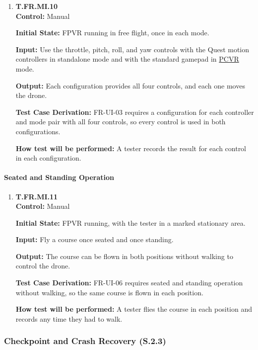 \documentclass[12pt, titlepage]{article}
\begin{document}
{\begin{enumerate}
\item{\hypertarget{test-fr-mi-10}{}\textbf{T.FR.MI.10}\\}
\textbf{Control:} Manual

\textbf{Initial State:} FPVR running in free flight, once in each mode.

\textbf{Input:} Use the throttle, pitch, roll, and yaw controls with the Quest motion
controllers in standalone mode and with the standard gamepad in \hyperlink{abbr:PCVR}{PCVR} mode.

\textbf{Output:} Each configuration provides all four controls, and each one moves the
drone.

\textbf{Test Case Derivation:} \mbox{FR-UI-03} requires a configuration for each
controller and mode pair with all four controls, so every control is used in both
configurations.

\textbf{How test will be performed:} A tester records the result for each control in
each configuration.

\end{enumerate}

\paragraph{Seated and Standing Operation}

\begin{enumerate}

\item{\hypertarget{test-fr-mi-11}{}\textbf{T.FR.MI.11}\\}
\textbf{Control:} Manual

\textbf{Initial State:} FPVR running, with the tester in a marked stationary area.

\textbf{Input:} Fly a course once seated and once standing.

\textbf{Output:} The course can be flown in both positions without walking to control
the drone.

\textbf{Test Case Derivation:} \mbox{FR-UI-06} requires seated and standing operation
without walking, so the same course is flown in each position.

\textbf{How test will be performed:} A tester flies the course in each position and
records any time they had to walk.

\end{enumerate}
\par}

\subsubsection{Checkpoint and Crash Recovery (S.2.3)}
\end{document}
